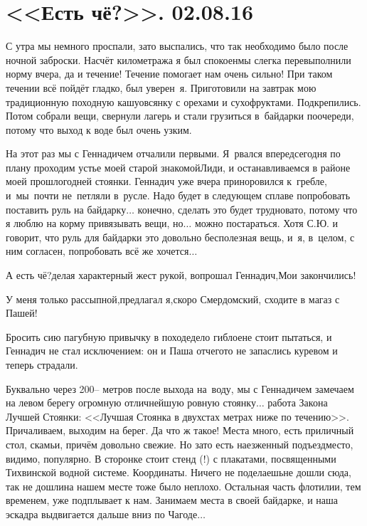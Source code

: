 \chapter{<<Есть чё?>>. 02.08.16} 

С утра мы немного проспали, зато выспались, что так необходимо было после ночной заброски. Насчёт километража я был спокоен\mdash мы слегка перевыполнили норму вчера, да и течение! Течение помогает нам очень сильно! При таком течении всё пойдёт гладко, был уверен~я. Приготовили на завтрак мою традиционную походную кашу\mdash овсянку с орехами и сухофруктами. Подкрепились. Потом собрали вещи, свернули лагерь и стали грузиться в~байдарки по\sdash очереди, потому что выход к воде был очень узким. 

На этот раз мы с Геннадичем отчалили первыми. Я~рвался вперед\mdash  сегодня по плану проходим устье моей старой знакомой\mdash  Лиди, и останавливаемся в районе моей прошлогодней стоянки. Геннадич уже вчера приноровился к~гребле, и~мы~почти не~петляли в~русле. Надо будет в следующем сплаве попробовать поставить руль на байдарку$\ldots$ конечно, сделать это будет трудновато, потому что я люблю на корму привязывать вещи, но$\ldots$ можно постараться. Хотя С.Ю. и говорит, что руль для байдарки это довольно бесполезная вещь, и~я, в~целом, с ним согласен, попробовать всё же хочется$\ldots$ 

\diagdash А есть чё?\mdash делая характерный жест рукой, вопрошал Геннадич,\mdash Мои закончились!

\diagdash У меня только рассыпной,\mdash предлагал я,\mdash скоро Смердомский, сходите в магаз с Пашей!

Бросить сию пагубную привычку в походе\mdash дело гиблое\mdash не стоит пытаться, и Геннадич не стал исключением: он и Паша отчего\sdash то не запаслись куревом и теперь страдали.

Буквально через 200\thinspace\nobreakdash-- метров после выхода на~воду, мы с Геннадичем замечаем на левом берегу огромную отличнейшую ровную стоянку$\ldots$  работа Закона Лучшей Стоянки: <<Лучшая Стоянка в двухстах метрах ниже по течению>>. Причаливаем, выходим на берег. Да что ж такое! Места много, есть приличный стол, скамьи, причём довольно свежие. Но зато есть наезженный подъезд\mdash  место, видимо, популярно. В сторонке стоит стенд (!) с плакатами, посвященными Тихвинской водной системе. Координаты\mdash \CoordsChagodaGood. Ничего не поделаешь\mdash не дошли сюда, так не дошли\mdash на нашем месте тоже было неплохо. Остальная часть флотилии, тем временем, уже подплывает к нам. Занимаем места в своей байдарке, и наша эскадра выдвигается дальше вниз по Чагоде$\ldots$  

